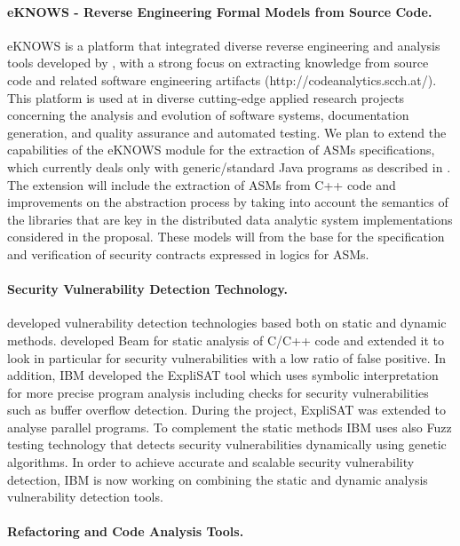 \documentclass[a4paper,11pt]{article}
\begin{document}
\paragraph{\SCCHshort{} eKNOWS - Reverse Engineering Formal Models from Source Code.}
eKNOWS is a platform that integrated diverse reverse engineering and analysis tools developed by \SCCHshort{}, with a strong focus on extracting knowledge from source code and related software engineering artifacts (http://codeanalytics.scch.at/). This platform is used at \SCCHshort{} in diverse cutting-edge applied research projects concerning the analysis and evolution of software systems, documentation generation, and quality assurance and automated testing. 
We plan to extend the capabilities of the eKNOWS module for the extraction of ASMs specifications, which currently deals only with generic/standard Java programs as described in \cite{FerrarottiMP20,FerrarottiPMB19}. The extension will include the extraction of ASMs from C++ code and improvements on the abstraction process by taking into account the semantics of the libraries that are key in the distributed data analytic system implementations considered in the proposal. These models will from the base for the specification and verification of security contracts expressed in logics for ASMs.  

\paragraph{\IBM{} Security Vulnerability Detection Technology.}

\IBMshort{} developed vulnerability detection technologies based both on static and dynamic methods. \IBMshort{} developed Beam for static analysis of C/C++ code and extended it to look in particular for security vulnerabilities with a low ratio of false positive. In addition, IBM developed the ExpliSAT tool which uses symbolic interpretation for more precise program analysis including checks for security vulnerabilities such as buffer overflow detection. During the \rephrase{} project, ExpliSAT was extended to analyse parallel programs. To complement the static methods IBM uses also Fuzz testing technology that detects security vulnerabilities dynamically using genetic algorithms. In order to achieve accurate and scalable security vulnerability detection, IBM is now working on combining the static and dynamic analysis vulnerability detection tools.     

\paragraph{\SAshort{} \paraformance Refactoring and Code Analysis Tools.}
\end{document}
